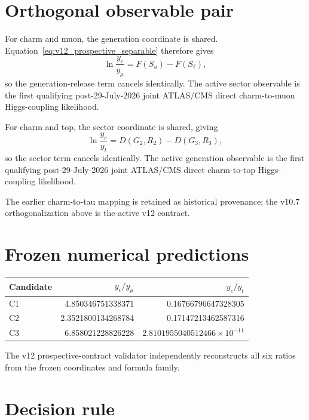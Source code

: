 \documentclass[11pt,a4paper,twoside]{book}
\theoremstyle{definition}
\begin{document}
\section{Orthogonal observable pair}

For charm and muon, the generation coordinate is shared. Equation~\eqref{eq:v12_prospective_separable} therefore gives
\begin{equation}
\boxed{
\ln\frac{y_c}{y_\mu}=F(S_u)-F(S_\ell),
}
\label{eq:v12_yc_ymu}
\end{equation}
so the generation-release term cancels identically. The active sector observable is the first qualifying post-29-July-2026 joint ATLAS/CMS direct charm-to-muon Higgs-coupling likelihood.

For charm and top, the sector coordinate is shared, giving
\begin{equation}
\boxed{
\ln\frac{y_c}{y_t}
=D(G_2,R_2)-D(G_3,R_3),
}
\label{eq:v12_yc_yt}
\end{equation}
so the sector term cancels identically. The active generation observable is the first qualifying post-29-July-2026 joint ATLAS/CMS direct charm-to-top Higgs-coupling likelihood.

The earlier charm-to-tau mapping is retained as historical provenance; the v10.7 orthogonalization above is the active v12 contract.

\section{Frozen numerical predictions}

\begin{center}
\begin{tabular}{lrr}
\toprule
Candidate & $y_c/y_\mu$ & $y_c/y_t$\\
\midrule
C1 & 4.850346751338371 & 0.16766796647328305\\
C2 & 2.3521800134268784 & 0.17147213462587316\\
C3 & 6.858021228826228 & $2.8101955040512466\times10^{-11}$\\
\bottomrule
\end{tabular}
\end{center}

The v12 prospective-contract validator independently reconstructs all six ratios from the frozen coordinates and formula family.

\section{Decision rule}
\end{document}
